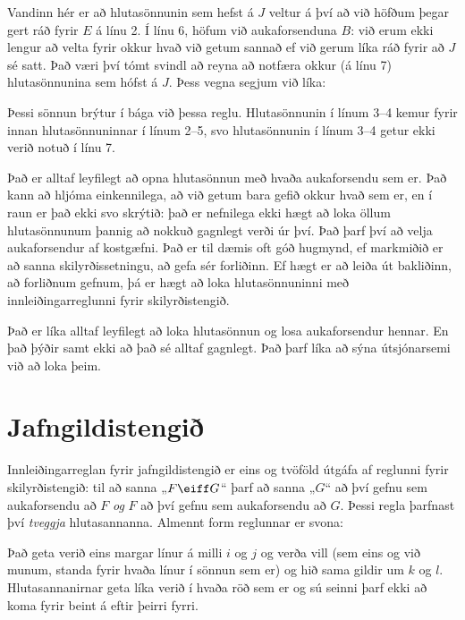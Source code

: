 Vandinn hér er að hlutasönnunin sem hefst á $J$ veltur á því að við höfðum þegar gert ráð fyrir $E$ á línu 2. Í línu 6, höfum við  aukaforsenduna $B$: við erum ekki lengur að velta fyrir okkur hvað við getum sannað ef við gerum líka ráð fyrir að $J$ sé satt. Það væri því tómt svindl að reyna að notfæra okkur (á línu 7) hlutasönnunina sem hófst á $J$. Þess vegna segjum við líka:

Þessi sönnun brýtur í bága við þessa reglu. Hlutasönnunin í línum 3--4 kemur fyrir innan hlutasönnuninnar í línum 2--5, svo hlutasönnunin í línum 3--4 getur ekki verið notuð í línu 7.

Það er alltaf leyfilegt að opna hlutasönnun með hvaða aukaforsendu sem er. Það kann að hljóma einkennilega, að við getum bara gefið okkur hvað sem er, en í raun er það ekki svo skrýtið: það er nefnilega ekki hægt að loka öllum hlutasönnunum þannig að nokkuð gagnlegt verði úr því. Það þarf því að velja aukaforsendur af kostgæfni. Það er til dæmis oft góð hugmynd, ef markmiðið er að sanna skilyrðissetningu, að gefa sér forliðinn. Ef hægt er að leiða út bakliðinn, að forliðnum gefnum, þá er hægt að loka hlutasönnuninni með innleiðingarreglunni fyrir skilyrðistengið.

Það er líka alltaf leyfilegt að loka hlutasönnun og losa aukaforsendur hennar. En það þýðir samt ekki að það sé alltaf gagnlegt. Það þarf líka að sýna útsjónarsemi við að loka þeim.

\section{Jafngildistengið}

Innleiðingarreglan fyrir jafngildistengið er eins og tvöföld útgáfa af reglunni fyrir skilyrðistengið: til að sanna „$F \eiff G$“ þarf að sanna „$G$“ að því gefnu sem aukaforsendu að $F$ \emph{og} $F$ að því gefnu sem aukaforsendu að $G$. Þessi regla þarfnast því \emph{tveggja} hlutasannanna. Almennt form reglunnar er svona:

Það geta verið eins margar línur á milli $i$ og $j$ og verða vill (sem eins og við munum, standa fyrir hvaða línur í sönnun sem er) og hið sama gildir um $k$ og $l$. Hlutasannanirnar geta líka verið í hvaða röð sem er og sú seinni þarf ekki að koma fyrir beint á eftir þeirri fyrri.
 
